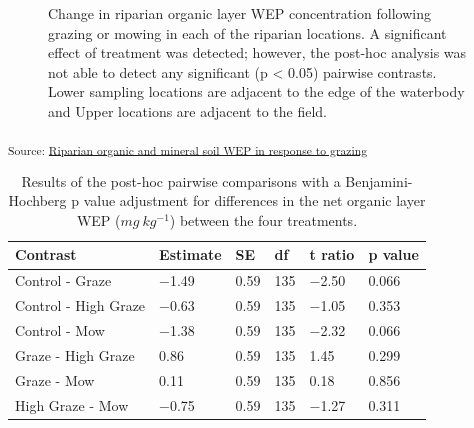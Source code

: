 \documentclass[
]{agujournal2019}
\begin{document}
\begin{figure}[H]


\caption{\label{fig-organic-wep}Change in riparian organic layer WEP
concentration following grazing or mowing in each of the riparian
locations. A significant effect of treatment was detected; however, the
post-hoc analysis was not able to detect any significant (p \textless{}
0.05) pairwise contrasts. Lower sampling locations are adjacent to the
edge of the waterbody and Upper locations are adjacent to the field.}

\end{figure}%

\textsubscript{Source:
\href{https://alex-koiter.github.io/riparian-grazing-manuscript/notebooks/03_Soils_analysis-preview.html\#cell-fig-organic-WEP}{Riparian
organic and mineral soil WEP in response to grazing}}

\begin{longtable}[]{@{}llllll@{}}

\caption{\label{tbl-organic-posthoc}Results of the post-hoc pairwise
comparisons with a Benjamini-Hochberg p value adjustment for differences
in the net organic layer WEP (\(mg~kg^{-1}\)) between the four
treatments.}

\tabularnewline

\toprule\noalign{}
Contrast & Estimate & SE & df & t ratio & p value \\
\midrule\noalign{}
\endhead
\bottomrule\noalign{}
\endlastfoot
Control - Graze & −1.49 & 0.59 & 135 & −2.50 & 0.066 \\
Control - High Graze & −0.63 & 0.59 & 135 & −1.05 & 0.353 \\
Control - Mow & −1.38 & 0.59 & 135 & −2.32 & 0.066 \\
Graze - High Graze & 0.86 & 0.59 & 135 & 1.45 & 0.299 \\
Graze - Mow & 0.11 & 0.59 & 135 & 0.18 & 0.856 \\
High Graze - Mow & −0.75 & 0.59 & 135 & −1.27 & 0.311 \\

\end{longtable}
\end{document}

